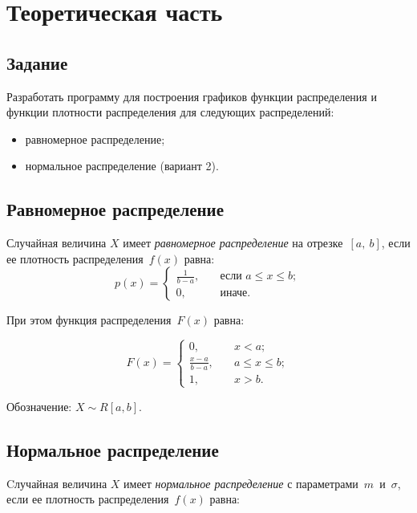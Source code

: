 \chapter{Теоретическая часть}


\section{Задание}

Разработать программу для построения графиков функции распределения и функции плотности распределения для следующих распределений: 
\begin{itemize}
	\item равномерное распределение;
	\item нормальное распределение (вариант 2).
\end{itemize} 

\section{Равномерное распределение}

Случайная величина $X$ имеет \textit{равномерное распределение} на отрезке~$[a,~b]$, если ее плотность распределения~$f(x)$ равна:
\begin{equation}
	p(x) =
	\begin{cases}
		\displaystyle\frac{1}{b - a}, & \quad \text{если } a \leq x \leq b;\\
		0,  & \quad \text{иначе}.
	\end{cases}
\end{equation}

При этом функция распределения~$F(x)$ равна:

\begin{equation}
	F(x) =
	\begin{cases}
		0,  & \quad x < a;\\
		\displaystyle\frac{x - a}{b - a}, & \quad a \leq x \leq b;\\
		1,  & \quad x > b.
	\end{cases}
\end{equation}

Обозначение: $X \sim R[a, b]$.

\clearpage

\section{Нормальное распределение}

Cлучайная величина $X$ имеет \textit{нормальное распределение} с
параметрами~$m$~и~$\sigma$, если ее плотность распределения~$f(x)$ равна:

